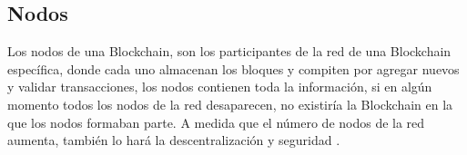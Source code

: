 \subsection{Nodos}
Los nodos de una Blockchain, son los participantes de la red de una  Blockchain específica, donde cada uno almacenan los bloques y compiten
por agregar  nuevos y validar transacciones, los nodos contienen toda la información, si 
en algún momento todos los nodos de la red desaparecen, no existiría la  Blockchain en la que los nodos formaban parte.
A medida que el número de nodos de la red aumenta, también lo hará la descentralización y seguridad \cite[]{drescher_Blockchain_2017,nakamoto_bitcoin_2008,vazquez_episodio_2020}.